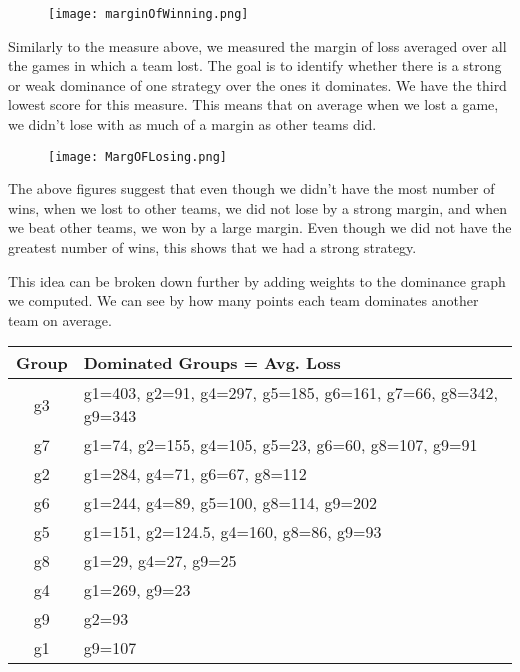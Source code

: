 \documentclass{scrartcl}
\begin{document}
\begin{figure}[H]
\texttt{[image: marginOfWinning.png]}
\end{figure}

Similarly to the measure above, we measured the margin of loss averaged over all the games in which a team lost. The goal is to identify whether there is a strong or weak dominance of one strategy over the ones it dominates. We have the third lowest score for this measure. This means that on average when we lost a game, we didn't lose with as much of a margin as other teams did. 

\begin{figure}[H]
\texttt{[image: MargOFLosing.png]}
\end{figure}

The above figures suggest that even though we didn't have the most number of wins, when we lost to other teams, we did not lose by a strong margin, and when we beat other teams, we won by a large margin. Even though we did not have the greatest number of wins, this shows that we had a strong strategy.

This idea can be broken down further by adding weights to the dominance graph we computed. We can see by how many points each team dominates another team on average. 

\begin{table}[H]
\centering
\begin{tabular}{|c|l|}\hline
Group & Dominated Groups = Avg. Loss \\ \hline
g3 & g1=403, g2=91, g4=297, g5=185, g6=161, g7=66, g8=342, g9=343 \\ \hline
g7 & g1=74, g2=155, g4=105, g5=23, g6=60, g8=107, g9=91 \\ \hline
g2 & g1=284, g4=71, g6=67, g8=112 \\ \hline
g6 & g1=244, g4=89, g5=100, g8=114, g9=202 \\ \hline
g5 & g1=151, g2=124.5, g4=160, g8=86, g9=93 \\ \hline
g8 & g1=29, g4=27, g9=25 \\ \hline
g4 & g1=269, g9=23 \\ \hline
g9 & g2=93 \\ \hline
g1 & g9=107 \\ \hline
\end{tabular}
\end{table}


\end{document}
